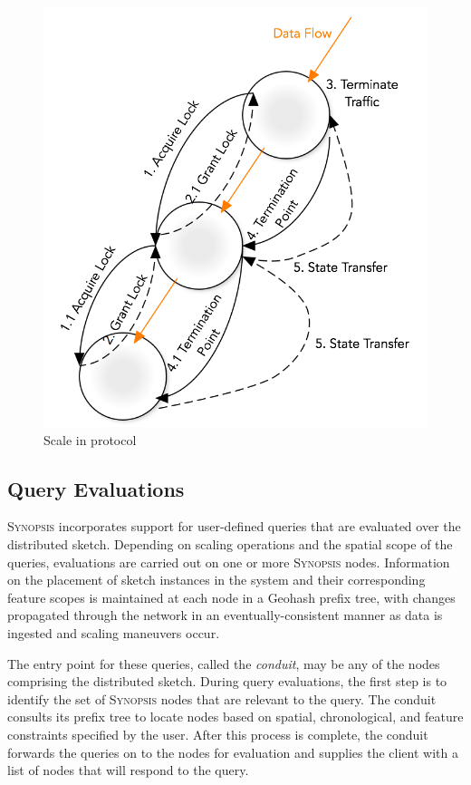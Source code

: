 \begin{figure}
    \centerline{\includegraphics[scale=0.55]{figures/scale-in-protocol.png}}
    \caption{Scale in protocol}
    \label{fig:scale-in-protocol}
\end{figure}

\subsection{Query Evaluations}
\label{subsec:query-eval}
\textsc{Synopsis} incorporates support for user-defined queries that are evaluated over the distributed sketch. Depending on scaling operations and the spatial scope of the queries, evaluations are carried out on one or more \textsc{Synopsis} nodes. Information on the placement of sketch instances in the system and their corresponding feature scopes is maintained at each node in a Geohash prefix tree, with changes propagated through the network in an eventually-consistent manner as data is ingested and scaling maneuvers occur.

The entry point for these queries, called the \emph{conduit}, may be any of the nodes comprising the distributed sketch. During query evaluations, the first step is to identify the set of \textsc{Synopsis} nodes that are relevant to the query. The conduit consults its prefix tree to locate nodes based on spatial, chronological, and feature constraints specified by the user. After this process is complete, the conduit forwards the queries on to the nodes for evaluation and supplies the client with a list of nodes that will respond to the query.

